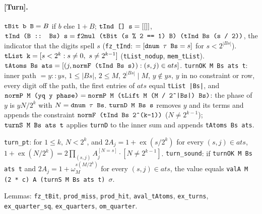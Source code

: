 \paragraph{[Turn].} $\textnormal{\texttt{tBit b B}} = B$ if $b$ else $1+B$;
$\textnormal{\texttt{tInd [] s}} = [[]]$, $\textnormal{\texttt{tInd (\allowbreak{}B :: Bs) s}} = \textnormal{\texttt{f2mul (\allowbreak{}tBit (\allowbreak{}s \% 2 == 1) B) (\allowbreak{}tInd Bs (\allowbreak{}s / 2))}}$,
the indicator that the digits spell $s$ (\textnormal{\texttt{fz\_\allowbreak{}tInd}}: $=[\textnormal{\texttt{dnum \ensuremath{\tau} Bs}} = s]$ for
$s<2^{|Bs|}$). $\textnormal{\texttt{tList k}} = [s<2^k : s\ne0,\ s\ne2^{k-1}]$ (\textnormal{\texttt{tList\_\allowbreak{}nodup}},
\textnormal{\texttt{mem\_\allowbreak{}tList}}). $\textnormal{\texttt{tAtoms Bs ats}} = [(j,\textnormal{\texttt{normF (\allowbreak{}tInd Bs s)}}) : (s,j)\in ats]$.
\textnormal{\texttt{turnOK M Bs ats t}}: inner path $=y::ys$, $1\le|Bs|$, $2\le M$, $2^{|Bs|}\mid M$, $y\notin ys$,
$y$ in no constraint or row, every digit off the path, the first entries of $ats$ equal
\textnormal{\texttt{tList |Bs|}}, and $\textnormal{\texttt{normP M (\allowbreak{}yq y phase)}} = \textnormal{\texttt{normP M (\allowbreak{}tLift M (\allowbreak{}M / 2\^{}|Bs|) Bs)}}$:
the phase of $y$ is $yN/2^k$ with $N = \textnormal{\texttt{dnum \ensuremath{\tau} Bs}}$.
$\textnormal{\texttt{turnD M Bs s}}$ removes $y$ and its terms and appends the constraint
$\textnormal{\texttt{normF (\allowbreak{}tInd Bs 2\^{}(\allowbreak{}k-{}1))}}$ ($N\ne 2^{k-1}$); $\textnormal{\texttt{turnS M Bs ats t}}$ applies \textnormal{\texttt{turnD}} to
the inner sum and appends \textnormal{\texttt{tAtoms Bs ats}}.
\begin{theorem}
\textnormal{\texttt{turn\_\allowbreak{}pt}}: for $1\le k$, $N<2^k$, and $2A_j = 1+\operatorname{ex}(s/2^k)$ for every $(s,j)\in ats$,
$1+\operatorname{ex}(N/2^k) = 2\prod_{(s,j)}A_j^{[N=s]}\cdot[N\ne2^{k-1}]$.
\textnormal{\texttt{turn\_\allowbreak{}sound}}: if \textnormal{\texttt{turnOK M Bs ats t}} and $2A_j = 1+\omega_M^{s(M/2^k)}$ for every
$(s,j)\in ats$, the value equals \textnormal{\texttt{valA M (\allowbreak{}2 * c) A (\allowbreak{}turnS M Bs ats t) \ensuremath{\sigma}}}.
\end{theorem}
\noindent Lemmas: \textnormal{\texttt{fz\_\allowbreak{}tBit}}, \textnormal{\texttt{prod\_\allowbreak{}miss}}, \textnormal{\texttt{prod\_\allowbreak{}hit}}, \textnormal{\texttt{aval\_\allowbreak{}tAtoms}},
\textnormal{\texttt{ex\_\allowbreak{}turns}}, \textnormal{\texttt{ex\_\allowbreak{}quarter\_\allowbreak{}sq}}, \textnormal{\texttt{ex\_\allowbreak{}quarters}}, \textnormal{\texttt{om\_\allowbreak{}quarter}}.

